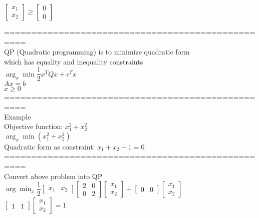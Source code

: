 \documentclass{article}
\begin{document}
$\begin{bmatrix}
x_1\\x_2
\end{bmatrix}
\ge
\begin{bmatrix}
0\\0
\end{bmatrix}$

================================================== \\
QP (Quadratic programming) is to minimize quadratic form \\ 
which has equality and inequality constraints \\ 

$\arg_x\min \dfrac{1}{2}x^TQx + c^Tx$ \\
$Ax = b$ \\
$x \ge 0$ \\

================================================== \\
Example \\ 

Objective function: $x_1^2 + x_2^2$ \\ 
$\arg_x\min (x_1^2 + x_2^2)$ \\ 

Quadratic form as constraint: $x_1 + x_2 - 1 = 0$ \\ 

================================================== \\
Convert above problem into QP \\ 
$\arg\min_x
\dfrac{1}{2}
\begin{bmatrix}
x_1 & x_2
\end{bmatrix}
\begin{bmatrix}
2 & 0\\0 & 2
\end{bmatrix}
\begin{bmatrix}
x_1\\x_2
\end{bmatrix}
+ 
\begin{bmatrix}
0 & 0
\end{bmatrix}
\begin{bmatrix}
x_1\\x_2
\end{bmatrix}$ \\

$\begin{bmatrix}
1 & 1
\end{bmatrix}
\begin{bmatrix}
x_1\\x_2
\end{bmatrix} = 1$ \\
\end{document}
